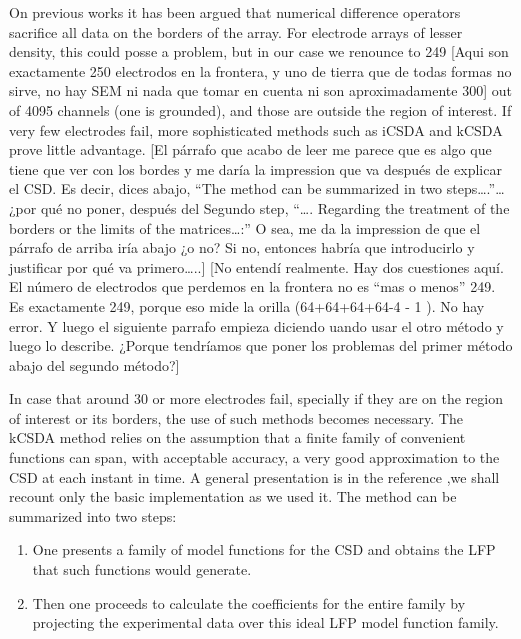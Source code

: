 \documentclass[letterpaper,12pts]{article}
\newcommand{\komment}[1]{{\color{red} [#1]}}
\newcommand{\romment}[1]{{\color{blue} [#1]}}
\begin{document}
On previous works it has been argued that numerical difference operators sacrifice all data on the borders of the array. For electrode arrays of lesser density, this could posse a problem, but in our case we renounce to 249
\komment{Aqui son exactamente 250 electrodos en la frontera, y  uno de tierra que
  de todas formas no sirve, no
  hay SEM ni nada que tomar en cuenta ni son aproximadamente 300}
out of 4095 channels (one is grounded), and those are outside the region of interest.
If very few electrodes fail, more sophisticated methods such as iCSDA \cite{Leski2011} and kCSDA \cite{Potworowski2011} prove little advantage.
\romment{El párrafo que acabo de leer me parece que es algo que tiene que ver con los bordes y me daría la impression que va después de explicar el CSD. Es decir, dices abajo, “The method can be summarized in two steps….”… ¿por qué no poner, después del Segundo step, “…. Regarding the treatment of the borders or the limits of the matrices…:” O sea, me da la impression de que el párrafo de arriba iría abajo ¿o no? Si no, entonces habría que introducirlo y justificar por qué va primero…..}
\komment{No entendí realmente. Hay dos cuestiones aquí. El número de electrodos
  que perdemos en la frontera no es ``mas o menos'' 249. Es exactamente 249, porque
  eso mide la orilla (64+64+64+64-4 - 1 ). No hay error. Y luego el siguiente parrafo empieza diciendo uando usar el otro método y luego lo describe. ¿Porque tendríamos que poner los
problemas del primer método abajo del segundo método?}

In case that around 30 or more electrodes
fail, specially if they are on the region of interest or its borders,
the use of such methods
becomes necessary. The kCSDA method relies on the
assumption that a finite family of convenient functions can span, with acceptable accuracy, a very good approximation to the  CSD at each instant in time.
A general presentation is in the reference \cite{Potworowski2011},we shall recount only the basic implementation as we used it. The
method can be summarized into two steps:
\begin{enumerate}
\item One presents a family of model functions for the CSD and
obtains the LFP that such functions
would generate.
\item Then one proceeds to calculate
  the coefficients for the entire family by projecting the
  experimental data over this ideal LFP model function family.
\end{enumerate}
\end{document}
